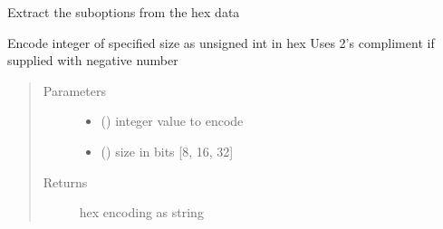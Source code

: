 \documentclass[letterpaper,10pt,english]{sphinxmanual}
\begin{document}
\begin{fulllineitems}
\begin{fulllineitems}
\begin{quote}
\begin{description}
\end{description}\end{quote}

\end{fulllineitems}


\begin{fulllineitems}
\label{\detokenize{dhcp_decode-class:bloxone.dhcp_decode.hex_to_suboptions}}
\sphinxAtStartPar
Extract the sub\sphinxhyphen{}options from the hex data

\end{fulllineitems}


\begin{fulllineitems}
\label{\detokenize{dhcp_decode-class:bloxone.dhcp_decode.hex_to_uint}}
\sphinxAtStartPar
Encode integer of specified size as unsigned int in hex
Uses 2’s compliment if supplied with negative number
\begin{quote}\begin{description}
\item[{Parameters}] \leavevmode\begin{itemize}
\item {} 
\sphinxAtStartPar
{} () \textendash{} integer value to encode

\item {} 
\sphinxAtStartPar
{} () \textendash{} size in bits {[}8, 16, 32{]}

\end{itemize}

\item[{Returns}] \leavevmode
\sphinxAtStartPar
hex encoding as string

\end{description}\end{quote}


\end{fulllineitems}
\end{fulllineitems}
\end{document}
